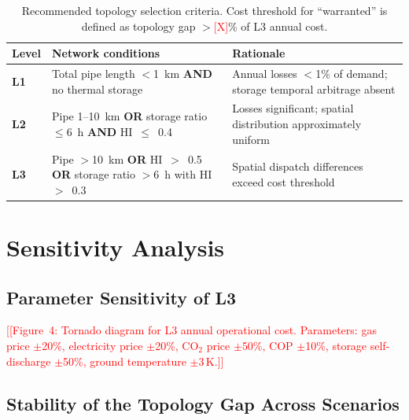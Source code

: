 \documentclass[review,3p]{elsarticle}
\newcommand{\placeholder}[1]{\textcolor{red}{[#1]}}
\begin{document}
\begin{table}[htbp]
\centering
\caption{Recommended topology selection criteria. Cost threshold for
``warranted'' is defined as topology gap $>$\placeholder{X}\% of L3
annual cost.}
\label{tab:criteria}
\begin{tabular}{@{}p{1.3cm}p{5.5cm}p{4.5cm}@{}}
\toprule
Level & Network conditions & Rationale \\
\midrule
\textbf{L1} & Total pipe length $<$1~km \textbf{AND} no thermal storage
  & Annual losses $<$1\% of demand; storage temporal arbitrage absent \\[4pt]
\textbf{L2} & Pipe 1--10~km \textbf{OR} storage ratio $\leq$6~h
  \textbf{AND} HI~$\leq$~0.4
  & Losses significant; spatial distribution approximately uniform \\[4pt]
\textbf{L3} & Pipe $>$10~km \textbf{OR} HI~$>$~0.5 \textbf{OR}
  storage ratio $>$6~h with HI~$>$~0.3
  & Spatial dispatch differences exceed cost threshold \\
\bottomrule
\end{tabular}
\end{table}

\section{Sensitivity Analysis}
\label{sec:sensitivity}

\subsection{Parameter Sensitivity of L3}
\label{sec:sens_tornado}

\placeholder{[Figure~4: Tornado diagram for L3 annual operational cost.
Parameters: gas price $\pm$20\%, electricity price $\pm$20\%,
CO$_2$ price $\pm$50\%, COP $\pm$10\%, storage self-discharge $\pm$50\%,
ground temperature $\pm$3\,K.]}

\subsection{Stability of the Topology Gap Across Scenarios}
\label{sec:sens_gap}
\end{document}
